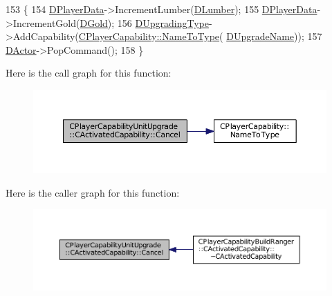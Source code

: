 \begin{DoxyCode}
153                                                              \{
154     \hyperlink{classCActivatedPlayerCapability_a9bf27c322a73f4b11c8183cc1973c3d8}{DPlayerData}->IncrementLumber(\hyperlink{classCPlayerCapabilityUnitUpgrade_1_1CActivatedCapability_aa4de5f57ea9d8dd85d7e6f62015c4a8d}{DLumber});
155     \hyperlink{classCActivatedPlayerCapability_a9bf27c322a73f4b11c8183cc1973c3d8}{DPlayerData}->IncrementGold(\hyperlink{classCPlayerCapabilityUnitUpgrade_1_1CActivatedCapability_a259a99f41ef918edf79f6827dec06559}{DGold});
156     \hyperlink{classCPlayerCapabilityUnitUpgrade_1_1CActivatedCapability_a028e222f2adc8a1035090487c93b358b}{DUpgradingType}->AddCapability(\hyperlink{classCPlayerCapability_a920a696526e8a839f728192aea0ba1c5}{CPlayerCapability::NameToType}(
      \hyperlink{classCPlayerCapabilityUnitUpgrade_1_1CActivatedCapability_acb0261591d692393b3c864d75edc799f}{DUpgradeName}));
157     \hyperlink{classCActivatedPlayerCapability_a54ca944b47bff2718330639941d402b0}{DActor}->PopCommand();
158 \}
\end{DoxyCode}
Here is the call graph for this function\+:\nopagebreak
\begin{figure}[H]
\begin{center}
\leavevmode
\includegraphics[width=350pt]{classCPlayerCapabilityUnitUpgrade_1_1CActivatedCapability_a29b41666081cf420e9f3b7d93c09920b_cgraph}
\end{center}
\end{figure}
Here is the caller graph for this function\+:\nopagebreak
\begin{figure}[H]
\begin{center}
\leavevmode
\includegraphics[width=350pt]{classCPlayerCapabilityUnitUpgrade_1_1CActivatedCapability_a29b41666081cf420e9f3b7d93c09920b_icgraph}
\end{center}
\end{figure}
\hypertarget{classCPlayerCapabilityUnitUpgrade_1_1CActivatedCapability_a86833312cb2f2460e923808fe0e19223}{}\label{classCPlayerCapabilityUnitUpgrade_1_1CActivatedCapability_a86833312cb2f2460e923808fe0e19223} 
